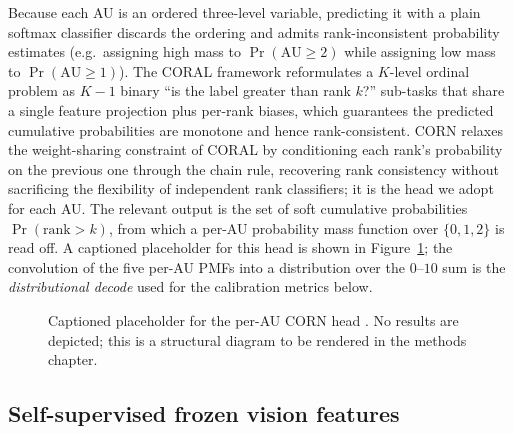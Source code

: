 Because each AU is an ordered three-level variable, predicting it with a plain
softmax classifier discards the ordering and admits rank-inconsistent
probability estimates (e.g.\ assigning high mass to $\Pr(\mathrm{AU}\geq 2)$
while assigning low mass to $\Pr(\mathrm{AU}\geq 1)$). The CORAL framework
\cite{cao2020coral} reformulates a $K$-level ordinal problem as $K-1$ binary
\enquote{is the label greater than rank $k$?} sub-tasks that share a single
feature projection plus per-rank biases, which guarantees the predicted
cumulative probabilities are monotone and hence rank-consistent. CORN
\cite{shi2023corn} relaxes the weight-sharing constraint of CORAL by conditioning
each rank's probability on the previous one through the chain rule, recovering
rank consistency without sacrificing the flexibility of independent rank
classifiers; it is the head we adopt for each AU. The relevant output is the set
of soft cumulative probabilities $\Pr(\mathrm{rank} > k)$, from which a per-AU
probability mass function over $\{0,1,2\}$ is read off. A captioned placeholder
for this head is shown in Figure~\ref{fig:corn-placeholder}; the convolution of
the five per-AU PMFs into a distribution over the $0$--$10$ sum is the
\emph{distributional decode} used for the calibration metrics below.

\begin{figure}[t]
  \centering
  \caption[CORN ordinal head schematic (placeholder)]{Captioned placeholder for
    the per-AU CORN head \cite{shi2023corn,cao2020coral}. No results are
    depicted; this is a structural diagram to be rendered in the methods
    chapter.}
  \label{fig:corn-placeholder}
\end{figure}

\subsection{Self-supervised frozen vision features}
\label{subsec:bg-dinov2}

